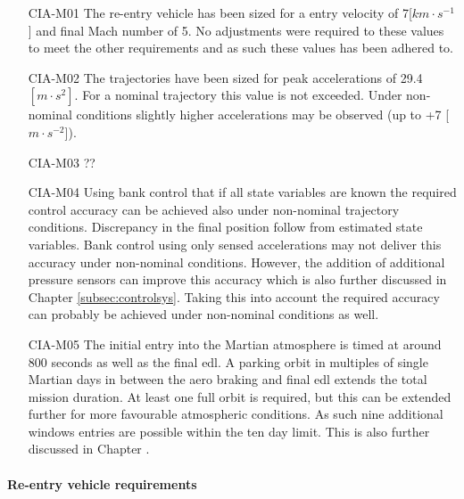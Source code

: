 \begin{itemize}
\item[CIA-M01]	The re-entry vehicle has been sized for a entry velocity of 7[$km \cdot s^{-1}$] and final Mach number of 5. No adjustments were required to these values to meet the other requirements and as such these values has been adhered to. 
\item[CIA-M02]	The trajectories have been sized for peak accelerations of 29.4 $[m \cdot s^{2}]$. For a nominal trajectory this value is not exceeded. Under non-nominal conditions slightly higher accelerations may be observed (up to +7 [$m \cdot s ^{-2}$]). 
\item[CIA-M03] ??
\item[CIA-M04]	Using bank control that if all state variables are known the required control accuracy can be achieved also under non-nominal trajectory conditions. Discrepancy in the final position follow from estimated state variables. Bank control using only sensed accelerations may not deliver this accuracy under non-nominal conditions. However, the addition of additional pressure sensors can improve this accuracy which is also further discussed in Chapter \ref{subsec:controlsys}. Taking this into account the required accuracy can probably be achieved under non-nominal conditions as well.
\item[CIA-M05] The initial entry into the Martian atmosphere is timed at around 800 seconds as well as the final \gls{edl}. A parking orbit in multiples of single Martian days in between the aero braking and final \gls{edl} extends the total mission duration. At least one full orbit is required, but this can be extended further for more favourable atmospheric conditions. As such nine additional windows entries are possible within the ten day limit. This is also further discussed  in Chapter \label{sec:trajectorydesign}.

\end{itemize}

\paragraph{Re-entry vehicle requirements}

